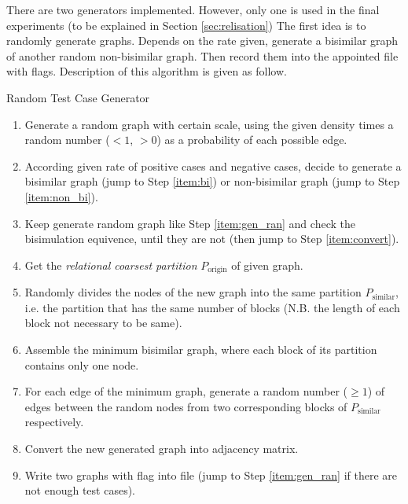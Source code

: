 There are two generators implemented.
However, only one is used in the final experiments (to be explained in Section \ref{sec:relisation})
The first idea is to randomly generate graphs.
Depends on the rate given, generate a bisimilar graph of another random non-bisimilar graph.
Then record them into the appointed file with flags.
Description of this algorithm is given as follow.
\begin{algor}
\label{alg:R_tcg}
Random Test Case Generator
\begin{enumerate}
    \item \label{item:gen_ran}Generate a random graph with certain scale, using the given density times a random number ($< 1$, $> 0$) as a probability of each possible edge.
    \item According given rate of positive cases and negative cases, decide to generate a bisimilar graph (jump to Step \ref{item:bi}) or non-bisimilar graph (jump to Step \ref{item:non_bi}).
    \item \label{item:non_bi} Keep generate random graph like Step \ref{item:gen_ran} and check the bisimulation equivence, until they are not (then jump to Step \ref{item:convert}).
    
    \item \label{item:bi}Get the \emph{relational coarsest partition} $P_\text{origin}$ of given graph.
    \item Randomly divides the nodes of the new graph into the same partition $P_\text{similar}$, i.e. the partition that has the same number of blocks (N.B. the length of each block not necessary to be same).
    \item Assemble the minimum bisimilar graph, where each block of its partition contains only one node. 
    \item \label{item:bi_end}For each edge of the minimum graph, generate a random number ($\geq 1$) of edges between the random nodes from two corresponding blocks of $P_\text{similar}$ respectively.
    
    \item \label{item:convert}Convert the new generated graph into adjacency matrix.
    \item Write two graphs with flag into file (jump to Step \ref{item:gen_ran} if there are not enough test cases).
\end{enumerate}
\end{algor}

